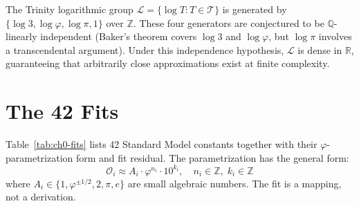 The Trinity logarithmic group \(\mathcal{L} = \{\log T : T \in \mathcal{T}\}\) is generated by \(\{\log 3, \log \varphi, \log \pi, 1\}\) over \(\mathbb{Z}\). These four generators are conjectured to be \(\mathbb{Q}\)-linearly independent (Baker's theorem covers \(\log 3\) and \(\log \varphi\), but \(\log \pi\) involves a transcendental argument). Under this independence hypothesis, \(\mathcal{L}\) is dense in \(\mathbb{R}\), guaranteeing that arbitrarily close approximations exist at finite complexity.

\section{The 42 Fits}

Table~\ref{tab:ch0-fits} lists 42 Standard Model constants together with their
\(\varphi\)-parametrization form and fit residual. The parametrization has the
general form:
\begin{equation}
\mathcal{O}_i \approx A_i \cdot \varphi^{n_i} \cdot 10^{k_i},
\quad n_i \in \mathbb{Z},\; k_i \in \mathbb{Z}
\label{eq:ch0-fit}
\end{equation}
where $A_i \in \{1, \varphi^{\pm 1/2}, 2, \pi, e\}$ are small algebraic
numbers. The fit is a mapping, not a derivation.

